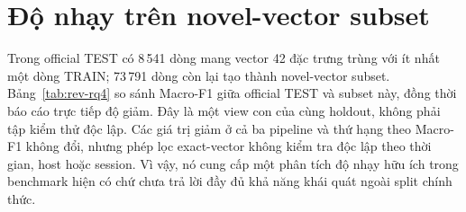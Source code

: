 \section{Độ nhạy trên novel-vector subset}
\label{sec:novel-vector}

Trong official TEST có 8\,541 dòng mang vector 42 đặc trưng trùng với ít nhất một dòng TRAIN; 73\,791 dòng còn lại tạo thành novel-vector subset. Bảng~\ref{tab:rev-rq4} so sánh Macro-F1 giữa official TEST và subset này, đồng thời báo cáo trực tiếp độ giảm. Đây là một view con của cùng holdout, không phải tập kiểm thử độc lập. Các giá trị giảm ở cả ba pipeline và thứ hạng theo Macro-F1 không đổi, nhưng phép lọc exact-vector không kiểm tra độc lập theo thời gian, host hoặc session. Vì vậy, nó cung cấp một phân tích độ nhạy hữu ích trong benchmark hiện có chứ chưa trả lời đầy đủ khả năng khái quát ngoài split chính thức.
